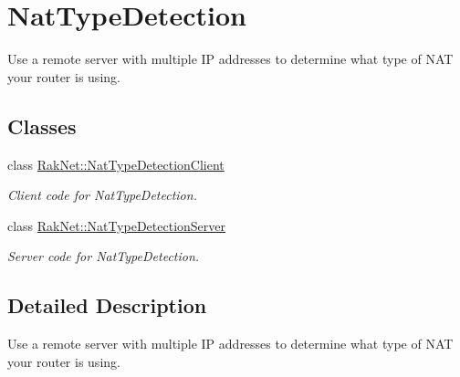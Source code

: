 \hypertarget{group___n_a_t___t_y_p_e___d_e_t_e_c_t_i_o_n___g_r_o_u_p}{\section{Nat\-Type\-Detection}
\label{group___n_a_t___t_y_p_e___d_e_t_e_c_t_i_o_n___g_r_o_u_p}
}


Use a remote server with multiple I\-P addresses to determine what type of N\-A\-T your router is using.  


\subsection*{Classes}
\begin{DoxyCompactItemize}
\item 
class \hyperlink{class_rak_net_1_1_nat_type_detection_client}{Rak\-Net\-::\-Nat\-Type\-Detection\-Client}
\begin{DoxyCompactList}\small\item\em Client code for Nat\-Type\-Detection. \end{DoxyCompactList}\item 
class \hyperlink{class_rak_net_1_1_nat_type_detection_server}{Rak\-Net\-::\-Nat\-Type\-Detection\-Server}
\begin{DoxyCompactList}\small\item\em Server code for Nat\-Type\-Detection. \end{DoxyCompactList}\end{DoxyCompactItemize}


\subsection{Detailed Description}
Use a remote server with multiple I\-P addresses to determine what type of N\-A\-T your router is using. 